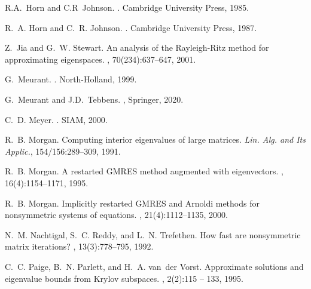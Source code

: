 \begin{thebibliography}{100}
	

	
	 R.A.~Horn and C.R~Johnson. . \newblock
	Cambridge University Press, 1985.
  
  
	

		
	 R.~A. Horn and C.~R. Johnson. . \newblock Cambridge
	University Press, 1987.
	


	
	 Z.~Jia and G.~W. Stewart. \newblock An analysis of the {Rayleigh-Ritz} method for
	approximating
	eigenspaces.
	, 70(234):637--647, 2001.
	
	 G.~Meurant. . \newblock
    North-Holland, 1999.

      G.~Meurant and J.D.~Tebbens.
    , Springer, 2020.
	

	

	
	 C.~D. Meyer. . \newblock SIAM,
	2000.
	
 R.~B. Morgan. \newblock Computing interior eigenvalues of large matrices. \newblock
{\em Lin. Alg. and Its Applic.}, 154/156:289--309, 1991.

 R.~B. Morgan. \newblock A restarted {GMRES} method augmented with eigenvectors.
    ,
  16(4):1154--1171, 1995.


 R.~B. Morgan. \newblock Implicitly restarted {GMRES} and {Arnoldi} methods for
nonsymmetric
systems of equations.
,
21(4):1112--1135, 2000.
	
 N.~M. Nachtigal, S.~C. Reddy, and L.~N. Trefethen. \newblock How fast are
    nonsymmetric matrix iterations? ,
  13(3):778--795, 1992.

   C.~C. Paige, B.~N. Parlett, and H.~A. van~der Vorst. \newblock Approximate
  solutions and eigenvalue bounds from {Krylov} subspaces. , 2(2):115 -- 133,
1995.


\end{thebibliography}
